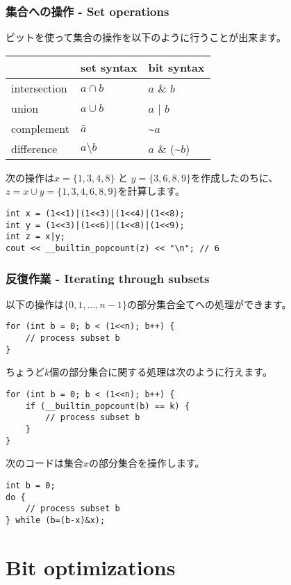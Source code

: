 \subsubsection{集合への操作 - Set operations}

ビットを使って集合の操作を以下のように行うことが出来ます。

\begin{center}
\begin{tabular}{lll}
& set syntax & bit syntax \\
\hline
intersection & $a \cap b$ & $a$ \& $b$ \\
union & $a \cup b$ & $a$ | $b$ \\
complement & $\bar a$ & \textasciitilde$a$ \\
difference & $a \setminus b$ & $a$ \& (\textasciitilde$b$) \\
\end{tabular}
\end{center}

次の操作は$x=\{1,3,4,8\}$ と $y=\{3,6,8,9\}$を作成したのちに、
$z = x \cup y = \{1,3,4,6,8,9\}$を計算します。

\begin{lstlisting}
int x = (1<<1)|(1<<3)|(1<<4)|(1<<8);
int y = (1<<3)|(1<<6)|(1<<8)|(1<<9);
int z = x|y;
cout << __builtin_popcount(z) << "\n"; // 6
\end{lstlisting}

\subsubsection{反復作業 - Iterating through subsets}

以下の操作は$\{0,1,\ldots,n-1\}$の部分集合全てへの処理ができます。

\begin{lstlisting}
for (int b = 0; b < (1<<n); b++) {
    // process subset b
}
\end{lstlisting}
ちょうど$k$個の部分集合に関する処理は次のように行えます。
\begin{lstlisting}
for (int b = 0; b < (1<<n); b++) {
    if (__builtin_popcount(b) == k) {
        // process subset b
    }
}
\end{lstlisting}
次のコードは集合$x$の部分集合を操作します。
\begin{lstlisting}
int b = 0;
do {
    // process subset b
} while (b=(b-x)&x);
\end{lstlisting}

\section{Bit optimizations}

